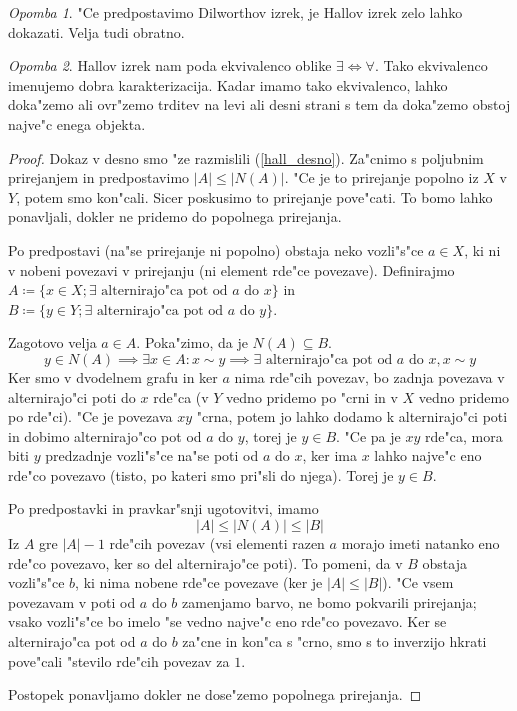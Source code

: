 \documentclass[a4paper,12pt]{article}
\theoremstyle{definition}
\theoremstyle{remark}
\newtheorem*{rem}{Opomba}
\begin{document}
\begin{rem}
	"Ce predpostavimo Dilworthov izrek, je Hallov izrek zelo lahko dokazati. Velja tudi obratno.
\end{rem}
\begin{rem}
	Hallov izrek nam poda ekvivalenco oblike $\exists \iff \forall$. Tako ekvivalenco imenujemo dobra karakterizacija. Kadar imamo tako ekvivalenco, lahko doka"zemo ali ovr"zemo trditev na levi ali desni strani s tem da doka"zemo obstoj najve"c enega objekta.
	
\end{rem}
\begin{proof}
	Dokaz v desno smo "ze razmislili (\ref{hall_desno}). Za"cnimo s poljubnim prirejanjem in predpostavimo $|A| \leqslant |N(A)|$. "Ce je to prirejanje popolno iz $X$ v $Y$, potem smo kon"cali. Sicer poskusimo to prirejanje pove"cati. To bomo lahko ponavljali, dokler ne pridemo do popolnega prirejanja.
	
	Po predpostavi (na"se prirejanje ni popolno) obstaja neko vozli"s"ce $a \in X$, ki ni v nobeni povezavi v prirejanju (ni element rde"ce povezave). Definirajmo \\
	$A \coloneqq \{x \in X; \exists \text{ alternirajo"ca pot od }a\text{ do }x\}$ in\\
	$B \coloneqq \{y \in Y; \exists \text{ alternirajo"ca pot od }a\text{ do }y\}$.
	
	Zagotovo velja $a \in A$. Poka"zimo, da je $N(A) \subseteq B$.
	\[y \in N(A) \implies \exists x \in A: x \sim y \implies \exists \text{ alternirajo"ca pot od }a\text{ do }x, x \sim y\]
	Ker smo v dvodelnem grafu in ker $a$ nima rde"cih povezav, bo zadnja povezava v alternirajo"ci poti do $x$ rde"ca (v $Y$ vedno pridemo po "crni in v $X$ vedno pridemo po rde"ci). "Ce je povezava $xy$ "crna, potem jo lahko dodamo k alternirajo"ci poti in dobimo alternirajo"co pot od $a$ do $y$, torej je $y \in B$. "Ce pa je $xy$ rde"ca, mora biti $y$ predzadnje vozli"s"ce na"se poti od $a$ do $x$, ker ima $x$ lahko najve"c eno rde"co povezavo (tisto, po kateri smo pri"sli do njega). Torej je $y \in B$.
	
	Po predpostavki in pravkar"snji ugotovitvi, imamo
	\[ |A| \leqslant |N(A)| \leqslant |B| \]
	Iz $A$ gre $|A|-1$ rde"cih povezav (vsi elementi razen $a$ morajo imeti natanko eno rde"co povezavo, ker so del alternirajo"ce poti). To pomeni, da v $B$ obstaja vozli"s"ce $b$, ki nima nobene rde"ce povezave (ker je $|A|\leqslant|B|$). "Ce vsem povezavam v poti od $a$ do $b$ zamenjamo barvo, ne bomo pokvarili prirejanja; vsako vozli"s"ce bo imelo "se vedno najve"c eno rde"co povezavo. Ker se alternirajo"ca pot od $a$ do $b$ za"cne in kon"ca s "crno, smo s to inverzijo hkrati pove"cali "stevilo rde"cih povezav za $1$.
	
	Postopek ponavljamo dokler ne dose"zemo popolnega prirejanja.
\end{proof}
\end{document}
